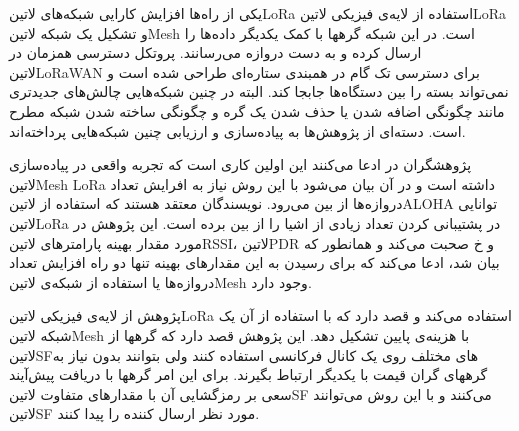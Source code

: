 
یکی از راه‌ها افزایش کارایی شبکه‌های ‌لاتین{LoRa} استفاده از لایه‌ی فیزیکی ‌لاتین{LoRa} و تشکیل یک شبکه ‌لاتین{Mesh} است. در این شبکه گرهها با کمک یکدیگر داده‌ها را ارسال کرده و به دست دروازه می‌رسانند.
پروتکل دسترسی همزمان در ‌لاتین{LoRaWAN} برای دسترسی تک گام در همبندی ستاره‌ای طراحی شده است و نمی‌تواند بسته را بین دستگاه‌ها جابجا کند.
البته در چنین شبکه‌هایی چالش‌های جدیدتری مانند چگونگی اضافه شدن یا حذف شدن یک گره و چگونگی ساخته شدن شبکه مطرح است.
دسته‌ای از پژوهش‌ها به پیاده‌سازی و ارزیابی چنین شبکه‌هایی پرداخته‌اند.

پژوهشگران در  ادعا می‌کنند این اولین کاری است که تجربه واقعی در پیاده‌سازی ‌لاتین{Mesh LoRa} داشته است
و در آن بیان می‌شود با این روش نیاز به افرایش تعداد دروازه‌ها از بین می‌رود.
نویسندگان معتقد هستند که استفاده از ‌لاتین{ALOHA} توانایی ‌لاتین{LoRa} در پشتیبانی کردن تعداد زیادی از اشیا را از بین برده است.
این پژوهش در مورد مقدار بهینه پارامترهای ‌لاتین{RSSI}، ‌لاتین{PDR} و ‌خ صحبت می‌کند و همانطور که بیان شد، ادعا می‌کند که برای رسیدن به این مقدارهای بهینه تنها دو راه افزایش تعداد دروازه‌ها یا استفاده از شبکه‌ی ‌لاتین{Mesh} وجود دارد.


پژوهش  از لایه‌ی فیزیکی ‌لاتین{LoRa} استفاده می‌کند و قصد دارد که با استفاده از آن یک شبکه ‌لاتین{Mesh} با هزینه‌ی پایین تشکیل دهد.
این پژوهش قصد دارد که گرهها از ‌لاتین{SF}های مختلف روی یک کانال فرکانسی استفاده کنند ولی بتوانند بدون نیاز به گرههای گران قیمت با یکدیگر ارتباط بگیرند.
برای این امر گرهها با دریافت پیش‌آیند سعی بر رمزگشایی آن با مقدارهای متفاوت ‌لاتین{SF} می‌کنند و با این روش می‌توانند ‌لاتین{SF} مورد نظر ارسال کننده را پیدا کنند.
